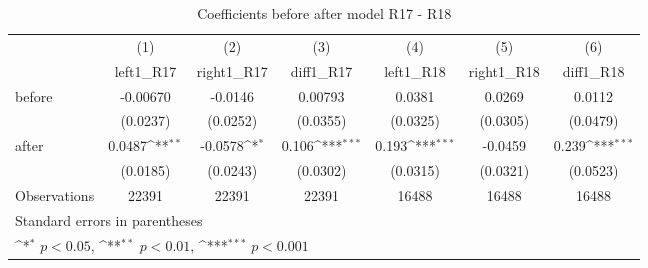 \begin{table}[!ht]\centering \footnotesize
\def\sym#1{\ifmmode^{#1}\else\(^{#1}\)\fi}
\caption{Coefficients before after model R17 - R18}
\begin{tabular}{l*{6}{c}}
\hline\hline
                    &\multicolumn{1}{c}{(1)}&\multicolumn{1}{c}{(2)}&\multicolumn{1}{c}{(3)}&\multicolumn{1}{c}{(4)}&\multicolumn{1}{c}{(5)}&\multicolumn{1}{c}{(6)}\\
                    &\multicolumn{1}{c}{left1\_R17}&\multicolumn{1}{c}{right1\_R17}&\multicolumn{1}{c}{diff1\_R17}&\multicolumn{1}{c}{left1\_R18}&\multicolumn{1}{c}{right1\_R18}&\multicolumn{1}{c}{diff1\_R18}\\
\hline
before              &    -0.00670         &     -0.0146         &     0.00793         &      0.0381         &      0.0269         &      0.0112         \\
                    &    (0.0237)         &    (0.0252)         &    (0.0355)         &    (0.0325)         &    (0.0305)         &    (0.0479)         \\
[1em]
after               &      0.0487\sym{**} &     -0.0578\sym{*}  &       0.106\sym{***}&       0.193\sym{***}&     -0.0459         &       0.239\sym{***}\\
                    &    (0.0185)         &    (0.0243)         &    (0.0302)         &    (0.0315)         &    (0.0321)         &    (0.0523)         \\
\hline
Observations        &       22391         &       22391         &       22391         &       16488         &       16488         &       16488         \\
\hline\hline
\multicolumn{7}{l}{\footnotesize Standard errors in parentheses}\\
\multicolumn{7}{l}{\footnotesize \sym{*} \(p<0.05\), \sym{**} \(p<0.01\), \sym{***} \(p<0.001\)}\\
\end{tabular}
\end{table}
